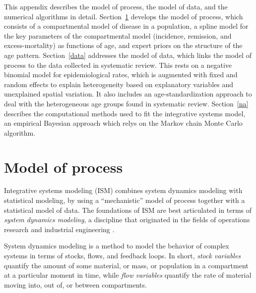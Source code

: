 \documentclass[12pt]{article}
\newcommand{\1}{\mathbf{1}}
\newcommand{\0}{\mathbf{0}}
\begin{document}
This appendix describes the model of process, the model of data, and
the numerical algorithms in detail.  Section~\ref{process} develops
the model of process, which consists of a compartmental model of
disease in a population, a spline model for the key parameters of the
compartmental model (incidence, remission, and excess-mortality) as
functions of age, and expert priors on the structure of the age
pattern.  Section~\ref{data} addresses the model of data, which links
the model of process to the data collected in systematic review.  This
rests on a negative binomial model for epidemiological rates, which is
augmented with fixed and random effects to explain heterogeneity based
on explanatory variables and unexplained spatial variation.  It also
includes an age-standardization approach to deal with the
heterogeneous age groups found in systematic review.  Section~\ref{na}
describes the computational methods used to fit the integrative
systems model, an empirical Bayesian approach which relys on the
Markov chain Monte Carlo algorithm.

\section{Model of process}
\label{process}
Integrative systems modeling (ISM) combines system dynamics modeling
with statistical modeling, by using a ``mechanistic'' model of process
together with a statistical model of data.  The foundations of ISM are
best articulated in terms of \emph{system dynamics modeling}, a
discipline that originated in the fields of operations research and
industrial engineering \cite{Forrester 1961. Industrial
  dynamics. Waltham, MA: Pegasus Communications} \cite{Forrester
  1969. Urban Dynamics. Pegasus Communications} \cite{Forrester
  1971. World Dynamics. Wright-Allen Press} \cite{Forrester
  1971. World Dynamics. Wright-Allen Press}
\cite{Meadows_Thinking_2008}.

System dynamics modeling is a method to model the behavior of complex
systems in terms of stocks, flows, and feedback loops.  In short,
\emph{stock variables} quantify the amount of some material, or mass,
or population in a compartment at a particular moment in time, while
\emph{flow variables} quantify the rate of material moving into, out
of, or between compartments.
\end{document}
